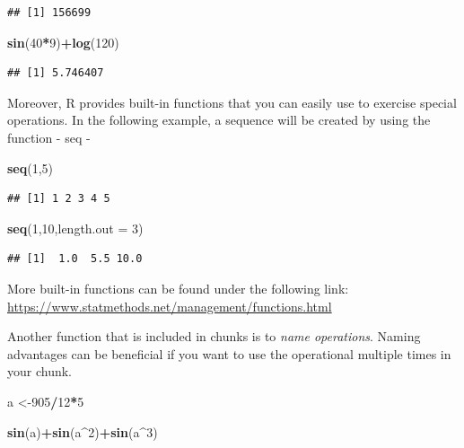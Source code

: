\documentclass[]{report}
\newenvironment{Shaded}{\begin{snugshade}}{\end{snugshade}}
\newcommand{\KeywordTok}[1]{\textcolor[rgb]{0.13,0.29,0.53}{\textbf{#1}}}
\newcommand{\DataTypeTok}[1]{\textcolor[rgb]{0.13,0.29,0.53}{#1}}
\newcommand{\DecValTok}[1]{\textcolor[rgb]{0.00,0.00,0.81}{#1}}
\newcommand{\OperatorTok}[1]{\textcolor[rgb]{0.81,0.36,0.00}{\textbf{#1}}}
\newcommand{\NormalTok}[1]{#1}
\begin{document}
\begin{verbatim}
## [1] 156699
\end{verbatim}

\begin{Shaded}
\begin{Highlighting}[]
\KeywordTok{sin}\NormalTok{(}\DecValTok{40}\OperatorTok{*}\DecValTok{9}\NormalTok{)}\OperatorTok{+}\KeywordTok{log}\NormalTok{(}\DecValTok{120}\NormalTok{)}
\end{Highlighting}
\end{Shaded}

\begin{verbatim}
## [1] 5.746407
\end{verbatim}

Moreover, R provides built-in functions that you can easily use to
exercise special operations. In the following example, a sequence will
be created by using the function - seq -

\begin{Shaded}
\begin{Highlighting}[]
\KeywordTok{seq}\NormalTok{(}\DecValTok{1}\NormalTok{,}\DecValTok{5}\NormalTok{)}
\end{Highlighting}
\end{Shaded}

\begin{verbatim}
## [1] 1 2 3 4 5
\end{verbatim}

\begin{Shaded}
\begin{Highlighting}[]
\KeywordTok{seq}\NormalTok{(}\DecValTok{1}\NormalTok{,}\DecValTok{10}\NormalTok{,}\DataTypeTok{length.out =} \DecValTok{3}\NormalTok{)}
\end{Highlighting}
\end{Shaded}

\begin{verbatim}
## [1]  1.0  5.5 10.0
\end{verbatim}

More built-in functions can be found under the following link:
\url{https://www.statmethods.net/management/functions.html}

Another function that is included in chunks is to \emph{name
operations}. Naming advantages can be beneficial if you want to use the
operational multiple times in your chunk.

\begin{Shaded}
\begin{Highlighting}[]
\NormalTok{a <-}\DecValTok{905}\OperatorTok{/}\DecValTok{12}\OperatorTok{*}\DecValTok{5}

\KeywordTok{sin}\NormalTok{(a)}\OperatorTok{+}\KeywordTok{sin}\NormalTok{(a}\OperatorTok{^}\DecValTok{2}\NormalTok{)}\OperatorTok{+}\KeywordTok{sin}\NormalTok{(a}\OperatorTok{^}\DecValTok{3}\NormalTok{)}
\end{Highlighting}
\end{Shaded}
\end{document}
